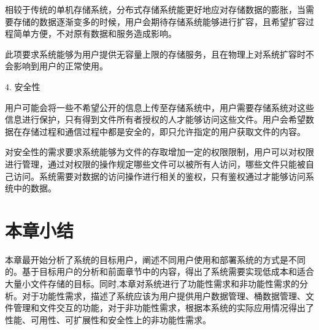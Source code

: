 相较于传统的单机存储系统，分布式存储系统能更好地应对存储数据的膨胀，当需要存储的数据逐渐变多的时候，用户会期待存储系统能够进行扩容，且希望扩容过程简单方便，不对原有数据和服务造成影响。

此项要求系统能够为用户提供无容量上限的存储服务，且在物理上对系统扩容时不会影响到用户的正常使用。

4. 安全性

用户可能会将一些不希望公开的信息上传至存储系统中，用户需要存储系统对这些信息进行保护，只有得到文件所有者授权的人才能够访问这些文件。用户会希望数据在存储过程和通信过程中都是安全的，即只允许指定的用户获取文件的内容。

对安全性的需求要求系统能够为文件的存取增加一定的权限限制，用户可以对权限进行管理，通过对权限的操作规定哪些文件可以被所有人访问，哪些文件只能被自己访问。系统需要对数据的访问操作进行相关的鉴权，只有鉴权通过才能够访问系统中的数据。

\section{本章小结}%
本章最开始分析了系统的目标用户，阐述不同用户使用和部署系统的方式是不同的。基于目标用户的分析和前面章节中的内容，得出了系统需要实现低成本和适合大量小文件存储的目标。同时,本章对系统进行了功能性需求和非功能性需求的分析。对于功能性需求，描述了系统应该为用户提供用户数据管理、桶数据管理、文件管理和文件交互的功能，对于非功能性需求，根据本系统的实际应用情况得出了性能、可用性、可扩展性和安全性上的非功能性需求。 
